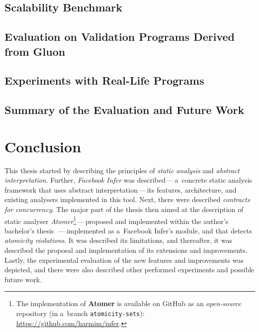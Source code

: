 \section{Scalability Benchmark}
\label{sec:expScal}


\section{Evaluation on Validation Programs Derived from Gluon}
\label{sec:expGluon}


\section{Experiments with Real-Life Programs}
\label{sec:expReal}


\section{Summary of the Evaluation and Future Work}
\label{sec:expSummary}






\chapter{Conclusion}
\label{chap:conc}

This thesis started by describing the principles of \emph{static analysis}
and \emph{abstract interpretation}. Further, \emph{Facebook Infer} was
described\,---\,a~concrete static analysis framework that uses abstract
interpretation\,---\,its features, architecture, and existing analysers
implemented in this tool. Next, there were described \emph{contracts for
concurrency}. The major part of the thesis then aimed at the description of
static analyser \emph{Atomer}\footnote{The implementation of \textbf{Atomer}
is available on GitHub as an \emph{open-source} repository (in a~branch
\texttt{atomicity-sets}):
\url{https://github.com/harmim/infer}.}\,---\,proposed and implemented
within the author's bachelor's thesis~\cite{harmimBP}\,---\,implemented as
a~Facebook Infer's module, and that detects \emph{atomicity violations}.
It was described its limitations, and thereafter, it was described the
proposal and implementation of its extensions and improvements. Lastly,
the experimental evaluation of the new features and improvements was
depicted, and there were also described other performed experiments
and possible future work.

